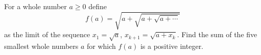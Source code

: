 For a whole number $a\ge0$ define
\[
f(a)=\sqrt{a+\sqrt{a+\sqrt{a+\cdots}}}
\]
as the limit of the sequence $x_1=\sqrt a$, $x_{k+1}=\sqrt{a+x_k}$. Find the sum of the five smallest whole numbers $a$ for which $f(a)$ is a positive integer.
